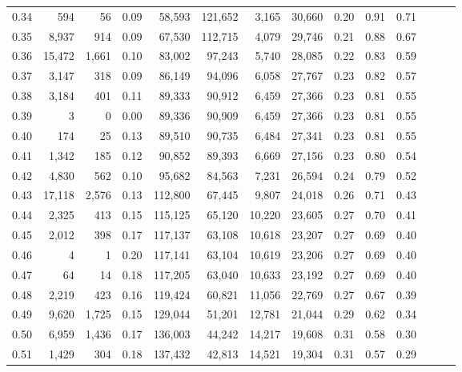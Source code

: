 \begin{tabular}{rrrrrrrrrrrrrr}
0.34 &     594 &     56 &  0.09 &   58,593 &  121,652 &   3,165 &  30,660 &  0.20 &  0.91 &      0.71 \\
0.35 &   8,937 &    914 &  0.09 &   67,530 &  112,715 &   4,079 &  29,746 &  0.21 &  0.88 &      0.67 \\
0.36 &  15,472 &  1,661 &  0.10 &   83,002 &   97,243 &   5,740 &  28,085 &  0.22 &  0.83 &      0.59 \\
0.37 &   3,147 &    318 &  0.09 &   86,149 &   94,096 &   6,058 &  27,767 &  0.23 &  0.82 &      0.57 \\
0.38 &   3,184 &    401 &  0.11 &   89,333 &   90,912 &   6,459 &  27,366 &  0.23 &  0.81 &      0.55 \\
0.39 &       3 &      0 &  0.00 &   89,336 &   90,909 &   6,459 &  27,366 &  0.23 &  0.81 &      0.55 \\
0.40 &     174 &     25 &  0.13 &   89,510 &   90,735 &   6,484 &  27,341 &  0.23 &  0.81 &      0.55 \\
0.41 &   1,342 &    185 &  0.12 &   90,852 &   89,393 &   6,669 &  27,156 &  0.23 &  0.80 &      0.54 \\
0.42 &   4,830 &    562 &  0.10 &   95,682 &   84,563 &   7,231 &  26,594 &  0.24 &  0.79 &      0.52 \\
0.43 &  17,118 &  2,576 &  0.13 &  112,800 &   67,445 &   9,807 &  24,018 &  0.26 &  0.71 &      0.43 \\
0.44 &   2,325 &    413 &  0.15 &  115,125 &   65,120 &  10,220 &  23,605 &  0.27 &  0.70 &      0.41 \\
0.45 &   2,012 &    398 &  0.17 &  117,137 &   63,108 &  10,618 &  23,207 &  0.27 &  0.69 &      0.40 \\
0.46 &       4 &      1 &  0.20 &  117,141 &   63,104 &  10,619 &  23,206 &  0.27 &  0.69 &      0.40 \\
0.47 &      64 &     14 &  0.18 &  117,205 &   63,040 &  10,633 &  23,192 &  0.27 &  0.69 &      0.40 \\
0.48 &   2,219 &    423 &  0.16 &  119,424 &   60,821 &  11,056 &  22,769 &  0.27 &  0.67 &      0.39 \\
0.49 &   9,620 &  1,725 &  0.15 &  129,044 &   51,201 &  12,781 &  21,044 &  0.29 &  0.62 &      0.34 \\
0.50 &   6,959 &  1,436 &  0.17 &  136,003 &   44,242 &  14,217 &  19,608 &  0.31 &  0.58 &      0.30 \\
0.51 &   1,429 &    304 &  0.18 &  137,432 &   42,813 &  14,521 &  19,304 &  0.31 &  0.57 &      0.29 \\

\end{tabular}
